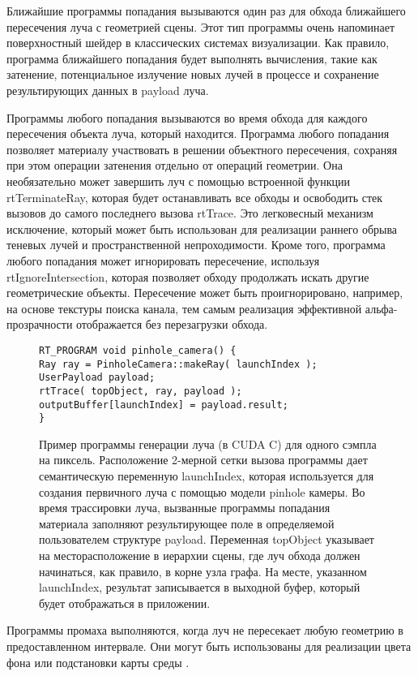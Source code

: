Ближайшие программы попадания вызываются один раз  для обхода ближайшего  пересечения луча с геометрией сцены.
 Этот тип программы очень напоминает поверхностный шейдер в классических системах визуализации.
 Как правило, программа ближайшего попадания будет выполнять вычисления, такие как затенение, потенциальное излучение новых лучей в процессе и сохранение результирующих данных в payload луча.

Программы любого попадания вызываются во время обхода для каждого пересечения объекта луча, который находится.
Программа любого попадания позволяет материалу участвовать в решении объектного пересечения, сохраняя при этом операции затенения отдельно от операций геометрии.
Она необязательно может завершить луч с помощью встроенной функции rtTerminateRay, которая будет останавливать все обходы и освободить стек вызовов до самого последнего вызова rtTrace.
Это легковесный механизм исключение, который может быть использован для реализации раннего обрыва теневых лучей и пространственной непроходимости.
Кроме того, программа любого попадания может игнорировать пересечение, используя rtIgnoreIntersection, которая позволяет обходу продолжать искать другие геометрические объекты.
Пересечение может быть проигнорировано, например, на основе текстуры поиска канала, тем самым реализация эффективной альфа-прозрачности отображается без перезагрузки обхода.
\begin{figure}[h]
\begin{verbatim}
RT_PROGRAM void pinhole_camera() {
Ray ray = PinholeCamera::makeRay( launchIndex );
UserPayload payload;
rtTrace( topObject, ray, payload );
outputBuffer[launchIndex] = payload.result;
}
\end{verbatim}
\caption{Пример программы генерации луча (в CUDA C) для одного сэмпла на пиксель.
Расположение 2-мерной сетки вызова программы дает семантическую переменную launchIndex, которая используется для создания первичного луча с помощью модели pinhole камеры.
Во время трассировки луча, вызванные программы попадания материала заполняют результирующее поле в определяемой пользователем структуре payload.
Переменная topObject указывает на месторасположение в иерархии сцены, где луч обхода должен начинаться, как правило, в корне узла графа.
На месте, указанном launchIndex, результат записывается в выходной буфер, который будет отображаться в приложении.}
\end{figure}

  Программы промаха выполняются, когда луч не пересекает любую геометрию в предоставленном интервале.
  Они могут быть использованы для реализации цвета фона или подстановки карты среды .

